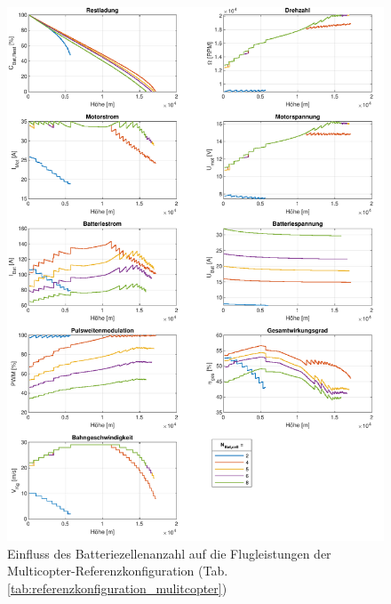 \begin{figure}[hbt!]
\centering
	\includegraphics[scale=0.70]{Diagramme/Untersuchung_N_Bat.pdf}
	\caption{Einfluss des Batteriezellenanzahl auf die Flugleistungen der Multicopter-Referenzkonfiguration (Tab. \ref{tab:referenzkonfiguration_mulitcopter})}
	\label{abb:N_Bat_einfluss}
\end{figure}


